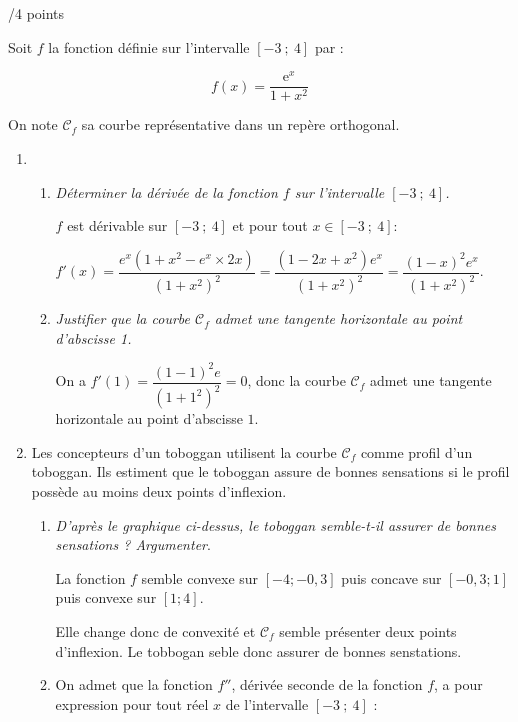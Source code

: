 \documentclass[a4paper]{article}
\begin{document}
\pagebreak

\begin{exerciceinterro}{\hspace{2cm}/4 points}{}



\medskip 

Soit $f$ la fonction définie sur l'intervalle $[-3~;~4]$ par :

\[f(x) = \dfrac{\text{e}^x}{1 + x^2}\]

On note $\mathcal{C}_f$ sa courbe représentative dans un repère orthogonal.

\medskip

\begin{enumerate}
\item 
	\begin{enumerate}
		\item \textit{Déterminer la dérivée de la fonction $f$ sur l'intervalle $[-3~;~4]$.}
		
		$f$ est dérivable sur $[-3~;~4]$ et pour tout $x\in[-3~;~4]$:
		
		$f'(x)=\dfrac{e^x(1+x^2-e^x\times 2x)}{(1+x^2)^2}=\dfrac{(1-2x+x^2)e^x}{(1+x^2)^2}=\dfrac{(1-x)^2e^x}{(1+x^2)^2}$.
		\item \textit{Justifier que la courbe $\mathcal{C}_f$ admet une tangente horizontale au point d'abscisse 1.}
		
		On a $f'(1)=\dfrac{(1-1)^2e}{(1+1^2)^2}=0$, donc la courbe $\mathcal{C}_f$ admet une tangente horizontale au point d'abscisse $1$.

	\end{enumerate}
\item  Les concepteurs d'un toboggan utilisent la courbe $\mathcal{C}_f$ comme profil d'un toboggan. Ils estiment que le toboggan assure de bonnes sensations si le profil possède au moins deux points d'inflexion.

\medskip

	\begin{enumerate}
		\item \textit{D'après le graphique ci-dessus, le toboggan semble-t-il assurer de bonnes sensations ? Argumenter}.
		
		La fonction $f$ semble convexe sur $[-4;-0,3]$ puis concave sur $[-0,3;1]$ puis convexe sur $[1;4]$.

		Elle change donc de convexité et $\mathcal{C}_f$ semble présenter deux points d'inflexion. Le tobbogan seble donc assurer de bonnes senstations.

		\item On admet que la fonction $f''$, dérivée seconde de la fonction $f$, a pour expression pour tout réel $x$ de l'intervalle $[-3~;~4]$ :


\end{enumerate}
\end{enumerate}
\end{exerciceinterro}
\end{document}
